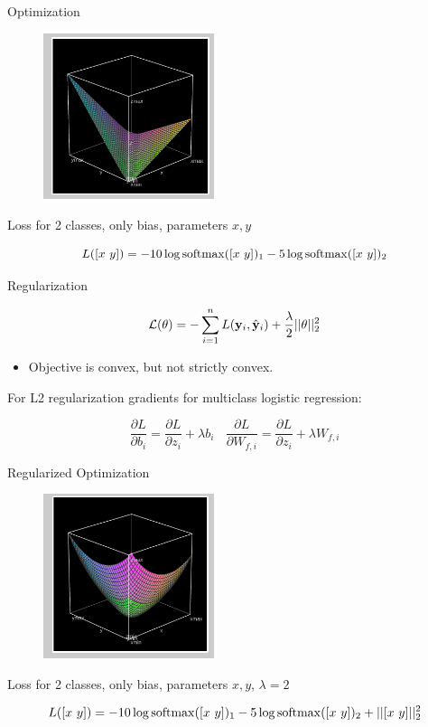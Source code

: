 \documentclass{beamer}
\begin{document}
\begin{frame}{Optimization}
  \begin{figure}
    \centering
    \includegraphics[width=5cm]{lrobj}
  \end{figure}
  
  \begin{center}
    Loss for 2 classes, only bias, parameters $x, y$
  \end{center}
  \[ L([x\ y]) = - 10 \log \softmax([x\ y])_1 -5\log \softmax([x\ y])_2 \] 

\end{frame}

\begin{frame}{Regularization}
 
  \[ \mathcal{L}(\theta) = - \sum_{i=1}^n L(\mathbf{y}_i, \hat{\mathbf{y}}_i) + \frac{\lambda}{2} ||\theta||^2_2\] 
  \begin{itemize}
  \item Objective is convex, but not strictly convex.
  \end{itemize}

  For L2 regularization gradients for multiclass logistic regression:
  
  \[\frac{\partial L}{\partial b_{i}} = 
    \frac{\partial L}{\partial z_{i}} + \lambda b_{i} \ \ \ \ \frac{\partial L}{\partial W_{f, i}} = 
     \frac{\partial L}{\partial z_{i}} + \lambda  W_{f, i}\]

\end{frame}


\begin{frame}{Regularized Optimization}
  \begin{figure}
    \centering
    \includegraphics[width=5cm]{lrobjl2}
  \end{figure}
  
  \begin{center}
    Loss for 2 classes, only bias, parameters $x, y$, $\lambda=2$
  \end{center}
  \[ L([x\ y]) = - 10 \log \softmax([x\ y])_1 -5\log \softmax([x\ y])_2 + ||[x\ y]||_2^2\] 

\end{frame}
\end{document}
